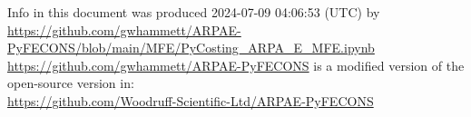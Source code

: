 {\footnotesize
\noindent
Info in this document was produced 2024-07-09 04:06:53 (UTC) by\\
\url{https://github.com/gwhammett/ARPAE-PyFECONS/blob/main/MFE/PyCosting_ARPA_E_MFE.ipynb}\\
\url{https://github.com/gwhammett/ARPAE-PyFECONS}
is a modified version of the open-source version in:\\
\url{https://github.com/Woodruff-Scientific-Ltd/ARPAE-PyFECONS}
} %
